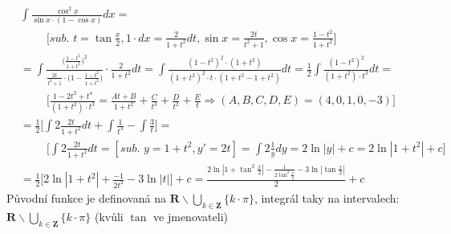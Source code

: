 \documentclass[a4paper]{article}
\begin{document}
\section{}
\begin{align*}
	& \int \frac{\cos^2x}{\sin x \cdot (1-\cos x)} dx = \hspace{15cm}\\
	& \hspace{1cm} \bigg[\textit{sub. } t = \tan\frac{x}{2}, 1\cdot dx = \frac{2}{1+t^2} dt, \sin x = \frac{2t}{t^2+1}, \cos x = \frac{1-t^2}{1+t^2} \bigg] \\
	& = \int \frac{\bigg(\frac{1-t^2}{1+t^2} \bigg)^2}{\frac{2t}{t^2+1} \cdot \bigg(1 - \frac{1-t^2}{1+t^2}\bigg)} \cdot \frac{2}{1+t^2} dt = \int \frac{(1-t^2)^2\cdot (1+t^2)}{(1+t^2)^2\cdot t \cdot (1+t^2 - 1 + t^2)} dt = \frac{1}{2}\int \frac{(1-t^2)^2}{(1+t^2)\cdot t^3} dt = \\
	& \hspace{1cm} \bigg[  \frac{1-2t^2+t^4}{(1+t^2)\cdot t^3} = \frac{At+B}{1+t^2} + \frac{C}{t^3} + \frac{D}{t^2} + \frac{E}{t} \Rightarrow (A, B, C, D, E) = (4, 0, 1, 0, -3) \bigg]\\
	& = \frac{1}{2} \bigg[ \int 2\frac{2t}{1+t^2} dt + \int \frac{1}{t^3} - \int \frac{3}{t}\bigg] = \\
	& \hspace{1cm} \bigg[ \int 2\frac{2t}{1+t^2} dt = [\textit{sub. } y = 1+t^2, y'= 2t] = \int 2\frac{1}{y} dy = 2\ln|y| +c = 2\ln|1+t^2|+c  \bigg] \\
	& = \frac{1}{2} \bigg[ 2\ln|1+t^2| + \frac{-1}{2 t^2} - 3 \ln|t| \bigg] +c = \frac{2\ln|1+\tan^2 \frac{x}{2}|-\frac{1}{2\tan^2 \frac{x}{2}}-3\ln | \tan\frac{x}{2}|}{2} +c 
\end{align*}
Původní funkce je definovaná na $\mathbf{R} \backslash \bigcup_{k \in \mathbf{Z}} \{k\cdot \pi \}$, integrál taky na intervalech: $\mathbf{R} \backslash \bigcup_{k \in \mathbf{Z}} \{k\cdot \pi \}$ (kvůli $\tan$ ve jmenovateli)
\end{document}
